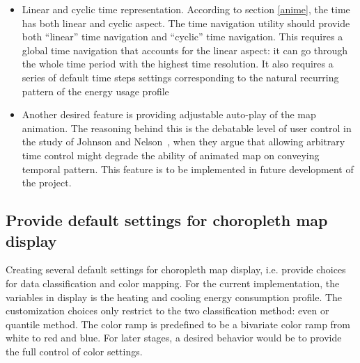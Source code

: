 \begin{itemize}

\item Linear and cyclic time representation. According to section
  \ref{anime}, the time has both linear and cyclic aspect. The time
  navigation utility should provide both ``linear'' time navigation
  and ``cyclic'' time navigation. This requires a global time
  navigation that accounts for the linear aspect: it can go through
  the whole time period with the highest time resolution. It also
  requires a series of default time steps settings corresponding to
  the natural recurring pattern of the energy usage profile
\item Another desired feature is providing adjustable auto-play of the
  map animation. The reasoning behind this is the debatable level of
  user control in the study of Johnson and Nelson~\cite{Nelson1998},
  when they argue that allowing arbitrary time control might degrade
  the ability of animated map on conveying temporal pattern. This
  feature is to be implemented in future development of the project.
\end{itemize}

\subsection{Provide default settings for choropleth map display}
Creating several default settings for choropleth map display,
i.e. provide choices for data classification and color mapping. For
the current implementation, the variables in display is the heating
and cooling energy consumption profile. The customization choices only
restrict to the two classification method: even or quantile
method. The color ramp is predefined to be a bivariate color ramp from
white to red and blue. For later stages, a desired behavior would be
to provide the full control of color settings.

